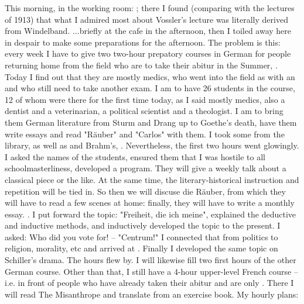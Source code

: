 
\missing

This morning, in the working room: ; there I found (comparing with the lectures of 1913) that what I admired most about Vossler's lecture was literally derived from Windelband. ...briefly at the cafe in the afternoon, then I toiled away here in despair to make some preparations for the afternoon. The problem is this: every week I have to give two two-hour prepatory courses in German for people
returning home from the field who are to take their abitur in the Summer, . Today I find out that they are mostly medics, who went into the field as  with an  and who still need to take another exam. I am to have 26 students in the course, 12 of whom were there for the first time today, as I said mostly medics, also a dentist and a veterinarian, a political scientist and a theologist. I am to bring them German literature from Sturm and Drang up to Goethe's death, have them write essays and read "Räuber" and "Carlos" with them. I took some  from the library, as well as  and Brahm's, . Nevertheless, the first two hours went glowingly. I asked the names of the students, ensured them that I was hostile to all schoolmasterliness, developed a program. They will give a weekly talk about a classical piece or the like. At the same time, the literary-historical instruction and repetition will be tied in. So then we will discuse die Räuber, from which they will have to read a few scenes at home: finally, they will have to write a monthly essay. . I put forward the topic: "Freiheit, die ich meine", explained the deductive and inductive methods, and inductively developed the topic to the present. I asked: Who did you vote for! -- "Centrum!" I connected that from politics to religion, morality, etc and arrived at . Finally I developed the same topic on Schiller's drama. The hours flew by. I will likewise fill two first hours of the other German course. Other than that, I still have a 4-hour upper-level French course -- i.e. in front of people who have already taken their abitur and are only . There I will read The Misanthrope and translate from an exercise book. My hourly plans:

